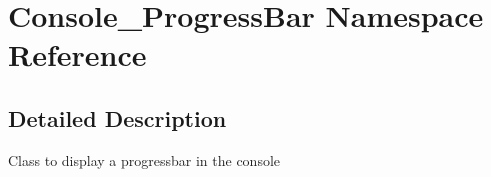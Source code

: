 \hypertarget{namespace_console___progress_bar}{
\section{Console\_\-ProgressBar Namespace Reference}
\label{namespace_console___progress_bar}
}


\subsection{Detailed Description}
Class to display a progressbar in the console 
